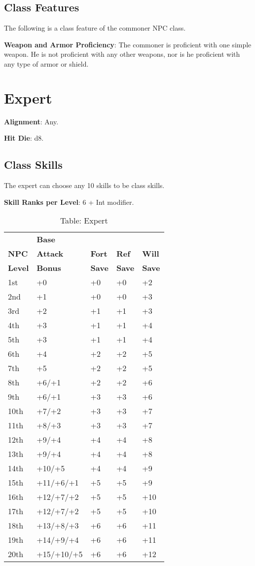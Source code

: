				
\subsection{Class Features}

				
The following is a class feature of the commoner NPC class.
				
\textbf{Weapon and Armor Proficiency}: The commoner is proficient with one simple weapon. He is not proficient with any other weapons, nor is he proficient with any type of armor or shield.
				
\section{Expert}

				
\textbf{Alignment}: Any.
				
\textbf{Hit Die}: d8.
				
\subsection{Class Skills}

				
The expert can choose any 10 skills to be class skills.
				
\textbf{Skill Ranks per Level}: 6 + Int modifier.
				
\begin{table}[]
\sffamily
\caption{Table: Expert}
\begin{tabular}{lllll}
               & \textbf{Base} \\
\textbf{NPC}   & \textbf{Attack} & \textbf{Fort} & \textbf{Ref} & \textbf{Will}\\
\textbf{Level} & \textbf{Bonus} & \textbf{Save} & \textbf{Save} & \textbf{Save}\\
1st & +0 & +0 & +0 & +2\\
2nd & +1 & +0 & +0 & +3\\
3rd & +2 & +1 & +1 & +3\\
4th & +3 & +1 & +1 & +4\\
5th & +3 & +1 & +1 & +4\\
6th & +4 & +2 & +2 & +5\\
7th & +5 & +2 & +2 & +5\\
8th & +6/+1 & +2 & +2 & +6\\
9th & +6/+1 & +3 & +3 & +6\\
10th & +7/+2 & +3 & +3 & +7\\
11th & +8/+3 & +3 & +3 & +7\\
12th & +9/+4 & +4 & +4 & +8\\
13th & +9/+4 & +4 & +4 & +8\\
14th & +10/+5 & +4 & +4 & +9\\
15th & +11/+6/+1 & +5 & +5 & +9\\
16th & +12/+7/+2 & +5 & +5 & +10\\
17th & +12/+7/+2 & +5 & +5 & +10\\
18th & +13/+8/+3 & +6 & +6 & +11\\
19th & +14/+9/+4 & +6 & +6 & +11\\
20th & +15/+10/+5 & +6 & +6 & +12\\
\end{tabular}
\end{table}
			
